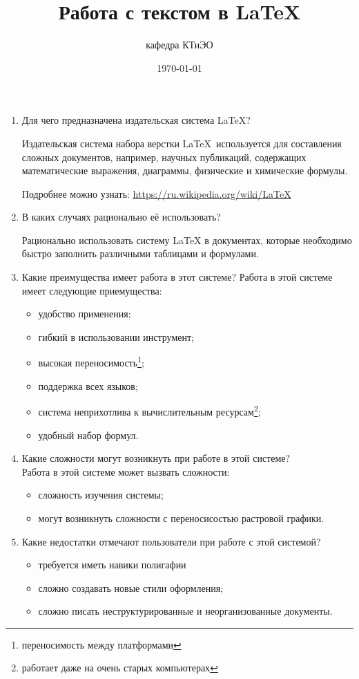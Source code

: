 \documentclass[a4paper,12pt]{article} %
\author{кафедра КТиЭО}
\title{Работа с текстом в \LaTeX{}}
\date{\today}
\begin{document}
\begin{enumerate}
    \item Для чего предназначена издательская система LaTeX? 
     \begin{flushright}
    Издательская система набора верстки \LaTeX\ используется для составления сложных 
    документов, например, научных публикаций, содержащих математические выражения, диаграммы, физические и химические формулы.
    \end{flushright}
    \begin{center}
    \large Подробнее можно узнать:
    \url{https://ru.wikipedia.org/wiki/LaTeX}
    \end{center}

    \item В каких случаях рационально её использовать?
    \begin{flushleft}
    Рационально использовать систему LaTeX в документах, которые необходимо быстро заполнить различными таблицами и формулами.
    \end{flushleft}
    
    \item Какие преимущества имеет работа в этот системе?
    Работа в этой системе имеет следующие приемущества:
    \begin{itemize}
        \item удобство применения;
        \item гибкий в использовании инструмент;
        \item высокая переносимость\footnote{переносимость между платформами};
        \item поддержка всех языков;
        \item система неприхотлива к вычислительным ресурсам\footnote{работает даже на очень старых компьютерах};
        \item удобный набор формул.
    \end{itemize}
    
    \item Какие сложности могут возникнуть при работе в этой системе? \\
    Работа в этой системе может вызвать сложности:
   
    \begin{itemize}
        \item сложность изучения системы;
        \item могут возникнуть сложности с переносисостью растровой графики.
    \end{itemize}
    
    \item Какие недостатки отмечают пользователи при работе с этой системой?
    \begin{itemize}
        \item требуется иметь навики полигафии
        \item сложно создавать новые стили оформления;
        \item сложно писать неструктурированные и неорганизованные документы.
    \end{itemize}


\end{enumerate}
\end{document}
